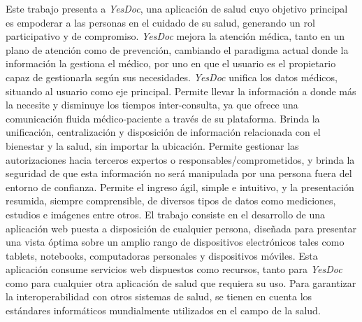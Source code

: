 \documentclass[a4paper,twocolumn,12pt]{article}
\begin{document}
{Este trabajo presenta a \textit{YesDoc}, una aplicación de salud cuyo objetivo principal es empoderar a las personas en el cuidado de su salud, generando un rol participativo y de compromiso.
\textit{YesDoc} mejora la atención médica, tanto en un plano de atención como de prevención, cambiando el paradigma actual donde la información la gestiona el médico, por uno en que el usuario es el propietario capaz de gestionarla según sus necesidades.
\textit{YesDoc} unifica los datos médicos, situando al usuario como eje principal. Permite llevar la información a donde más la necesite y disminuye los tiempos inter-consulta, ya que ofrece una comunicación fluida médico-paciente a través de su plataforma.  %
Brinda la unificación, centralización y disposición de información relacionada con el bienestar y la salud, sin importar la ubicación.
Permite gestionar las autorizaciones hacia terceros expertos o responsables/comprometidos, y brinda la seguridad de que esta información no será manipulada por una persona fuera del entorno de confianza. 
Permite el ingreso ágil, simple e intuitivo, y la presentación resumida, siempre comprensible, de diversos tipos de datos como mediciones, estudios e imágenes entre otros.
El trabajo consiste en el desarrollo de una aplicación web puesta a disposición de cualquier persona, diseñada para presentar una vista óptima sobre un amplio rango de dispositivos electrónicos tales como tablets, notebooks, computadoras personales y dispositivos móviles.
Esta aplicación consume servicios web dispuestos como recursos, tanto para \textit{YesDoc} como para cualquier otra aplicación de salud que requiera su uso.
Para garantizar la interoperabilidad con otros sistemas de salud, se tienen en cuenta los estándares informáticos mundialmente utilizados en el campo de la salud.
}
\end{document}
